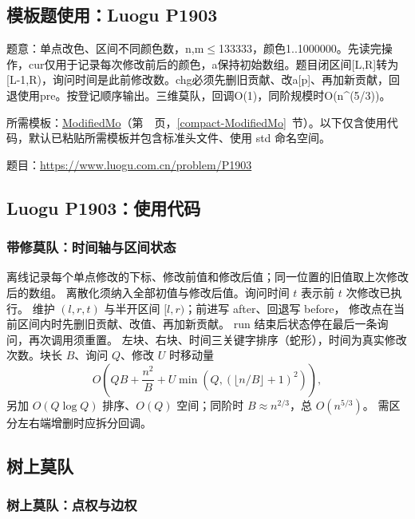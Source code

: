 \Needspace{200pt}

\subsection*{模板题使用：Luogu P1903}

题意：单点改色、区间不同颜色数，n,m$\le$133333，颜色1..1000000。先读完操作，cur仅用于记录每次修改前后的颜色，a保持初始数组。题目闭区间[L,R]转为[L-1,R)，询问时间是此前修改数。chg必须先删旧贡献、改a[p]、再加新贡献，回退使用pre。按登记顺序输出。三维莫队，回调O(1)，同阶规模时O(n\textasciicircum{}(5/3))。

所需模板：\hyperref[compact-ModifiedMo]{ModifiedMo}（第~\pageref{compact-ModifiedMo}~页，\ref{compact-ModifiedMo}~节）。以下仅含使用代码，默认已粘贴所需模板并包含标准头文件、使用 std 命名空间。

题目：\url{https://www.luogu.com.cn/problem/P1903}

\newpage

\subsection*{Luogu P1903：使用代码}

\label{usage-example-168}



\subsubsection{带修莫队：时间轴与区间状态}\label{knowledge-mo-time}
离线记录每个单点修改的下标、修改前值和修改后值；同一位置的旧值取上次修改后的数组。
离散化须纳入全部初值与修改后值。询问时间 $t$ 表示前 $t$ 次修改已执行。
维护 $(l,r,t)$ 与半开区间 $[l,r)$；前进写 after、回退写 before，
修改点在当前区间内时先删旧贡献、改值、再加新贡献。
run 结束后状态停在最后一条询问，再次调用须重置。
左块、右块、时间三关键字排序（蛇形），时间为真实修改次数。块长 $B$、询问 $Q$、修改 $U$ 时移动量
\[
O\left(QB+\frac{n^2}{B}+U\min\left(Q,(\lfloor n/B\rfloor+1)^2\right)\right),
\]
另加 $O(Q\log Q)$ 排序、$O(Q)$ 空间；同阶时 $B\approx n^{2/3}$，总 $O(n^{5/3})$。
需区分左右端增删时应拆分回调。


\Needspace{180pt}

\subsection{树上莫队}

\subsubsection{树上莫队：点权与边权}\label{compact-TreeMo}

